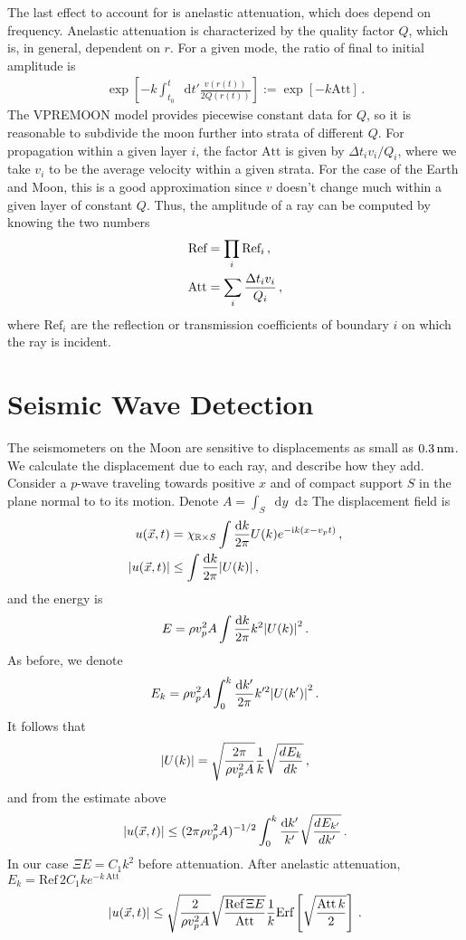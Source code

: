 \documentclass[prd,reprint,10pt,tightenlines]{revtex4-1}
\newcommand*\diff{\mathop{}\!\mathrm{d}}
\newcommand*\R{\mathbb R}
\newcommand*\te[1]{\text{#1}}
\newcommand*\ps[1]{\left[#1\right]}
\newcommand*\f[2]{\frac{#1}{#2}}
\newcommand*\I{\te{i}}
\newcommand*\td[3]{\frac{d^{#3}#1}{d #2^{#3}}}
\begin{document}
The last effect to account for is anelastic attenuation, which does depend on frequency. Anelastic attenuation is characterized by the quality factor $Q$, which is, in general, dependent on $r$. For a given mode, the ratio of final to initial amplitude is
\begin{align}
\exp\ps{-k \int_{t_0}^t\diff t'\f{v(r(t))}{2Q(r(t))}}:=\exp\ps{-k \te{Att}}\,.
\end{align}
The VPREMOON model provides piecewise constant data for $Q$, so it is reasonable to subdivide the moon further into strata of different $Q$. For propagation within a given layer $i$, the factor $\te{Att}$ is given by $\Delta t_i v_i/Q_i$, where we take $v_i$ to be the average velocity within a given strata. For the case of the Earth and Moon, this is a good approximation since $v$ doesn't change much within a given layer of constant $Q$. Thus, the amplitude of a ray can be computed by knowing the two numbers
\begin{align}
\te{Ref} \notag&= \prod_i\te{Ref}_i\,,\\
\te{Att} &=\sum_i\f{\Delta t_i v_i}{Q_i}\,,
\end{align}
where $\te{Ref}_i$ are the reflection or transmission coefficients of boundary $i$ on which the ray is incident.

\section{Seismic Wave Detection}
The seismometers on the Moon are sensitive to displacements as small as $0.3\te{\,nm}$. We calculate the displacement due to each ray, and describe how they add. Consider a $p$-wave traveling towards positive $x$ and of compact support $S$ in the plane normal to to its motion. Denote $A =\int_S\diff y\diff z$ The displacement field is
\begin{align}
u(\vec x,t) &= \chi_{\R\times S}\int\f{\diff k}{2\pi}U(k)e^{-\I k(x-v_p t)}\,,\\
\abs{u(\vec x,t)}&\leq\int\f{\diff k}{2\pi}\abs{U(k)}\,,
\end{align}
and the energy is
\begin{align}
E = \rho v_p^2 A\int\f{\diff k}{2\pi}k^2\abs{U(k)}^2\,.
\end{align}
As before, we denote
\begin{align}
E_k = \rho v_p^2 A\int_0^k\f{\diff k'}{2\pi}k'^2\abs{U(k')}^2\,.
\end{align}
It follows that
\begin{align}
\abs{U(k)} = \sqrt{\f{2\pi}{\rho v_p^2 A}}\f1k\sqrt{\td{E_k}{k}{}}\,,
\end{align}
and from the estimate above
\begin{align}
\abs{u(\vec x,t)}\leq(2\pi\rho v_p^2 A)^{-1/2}\int_0^k\f{\diff k'}{k'}\sqrt{\td{E_{k'}}{k'}{}}\,.
\end{align}
In our case $\Xi E= C_1 k^2$ before attenuation. After anelastic attenuation, $E_k =\te{Ref}\,2C_1 k e^{-k\,\te{Att}}$
\begin{align}
\abs{u(\vec x,t)}\leq\sqrt{\f{2}{\rho v_p^2 A}}\sqrt{\f{\te{Ref}\,\Xi E}{\te{Att}}}\f1k\te{Erf}\ps{\sqrt{\f{\te{Att}\,k}{2}}}\,.
\end{align}
\end{document}
